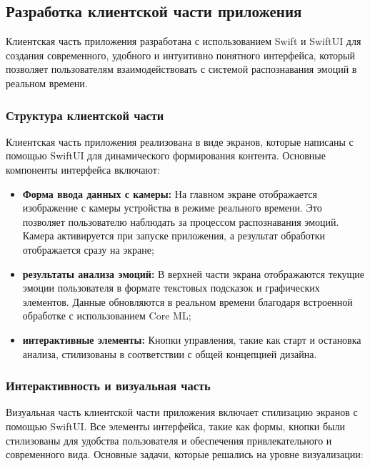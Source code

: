 {{}
\newpage

\subsection{Разработка клиентской части приложения}
{
    Клиентская часть приложения разработана с использованием Swift и SwiftUI для создания современного, удобного и интуитивно понятного интерфейса, который позволяет пользователям взаимодействовать с системой распознавания эмоций в реальном времени.

    \subsubsection*{Структура клиентской части}
    
    Клиентская часть приложения реализована в виде экранов, которые написаны с помощью SwiftUI для динамического формирования контента. Основные компоненты интерфейса включают:
    
    \begin{itemize}
        \item \textbf{Форма ввода данных с камеры:} На главном экране отображается изображение с камеры устройства в режиме реального времени. Это позволяет пользователю наблюдать за процессом распознавания эмоций. Камера активируется при запуске приложения, а результат обработки отображается сразу на экране;
        \item \textbf{результаты анализа эмоций:} В верхней части экрана отображаются текущие эмоции пользователя в формате текстовых подсказок и графических элементов. Данные обновляются в реальном времени благодаря встроенной обработке с использованием Core ML;
        \item \textbf{интерактивные элементы:} Кнопки управления, такие как старт и остановка анализа, стилизованы в соответствии с общей концепцией дизайна.
    \end{itemize}
    
    \subsubsection*{Интерактивность и визуальная часть}
    
    Визуальная часть клиентской части приложения включает стилизацию экранов с помощью SwiftUI. Все элементы интерфейса, такие как формы, кнопки были стилизованы для удобства пользователя и обеспечения привлекательного и современного вида. Основные задачи, которые решались на уровне визуализации:
    
}}
